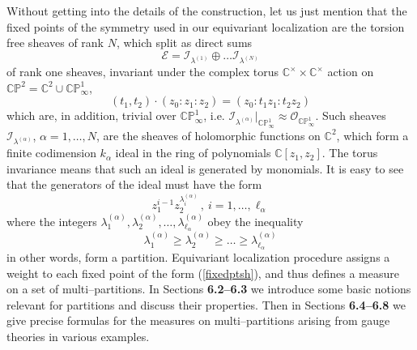 \documentclass[12pt]{article}
\numberwithin{equation}{section}
\newcommand\beq{\begin{equation}}
\newcommand\eeq{\end{equation}}
\theoremstyle{definition}
\newcommand {\BC}   {\mathbb C}
\newcommand {\BP}   {\mathbb P}
\newcommand {\CalE} {\mathcal E}
\newcommand {\CalI} {\mathcal I}
\newcommand {\CalO} {\mathcal O}
\begin{document}
Without getting into the details of the construction, let us just mention that the fixed points of the symmetry used in our equivariant localization are the torsion free sheaves of rank $N$, which split as direct sums
\beq\label{fixedptsh}
{\CalE}= {\CalI}_{{\lambda}^{(1)}} \oplus \ldots {\CalI}_{{\lambda}^{(N)}}
\eeq
of rank one sheaves, invariant under the complex torus ${\BC}^{\times} \times {\BC}^{\times}$
action on ${\BC\BP}^{2} = {\BC}^{2} \cup {\BC\BP}^{1}_{\infty}$, 
\beq
(t_{1}, t_{2}) \cdot (z_{0} : z_{1} : z_{2}) = (z_{0}: t_{1} z_{1} : t_{2}z_{2})
\eeq
which are, in addition, trivial over ${\BC\BP}^{1}_{\infty}$, i.e. ${{\CalI}_{{\lambda}^{(\alpha)}}}\vert_{{\BC\BP}^{1}_{\infty}} \approx {\CalO}_{{\BC\BP}^{1}_{\infty}}$. Such sheaves ${\CalI}_{{\lambda}^{({\alpha})}}$,  ${\alpha}= 1, \ldots, N$,  are the sheaves of holomorphic functions on ${\BC}^{2}$, which form a finite codimension $k_{\alpha}$ ideal in the ring of polynomials ${\BC}[z_{1}, z_{2}]$. The torus invariance means that such an ideal is generated by monomials. It is easy to see
that the generators of the ideal must have the form
\beq
z_{1}^{i-1} z_{2}^{{\lambda}_{i}^{({\alpha})}} \, , \ i = 1, \ldots, {\ell}_{\alpha}
\eeq
where the integers
${\lambda}^{({\alpha})}_{1}, {\lambda}^{({\alpha})}_{2}, \ldots, {\lambda}^{({\alpha})}_{{\ell}_{\alpha}}$ obey the inequality
\beq
{\lambda}^{({\alpha})}_{1} \geq {\lambda}^{({\alpha})}_{2} \geq  \ldots \geq {\lambda}^{({\alpha})}_{{\ell}_{\alpha}}
\eeq
in other words, form a partition. Equivariant localization procedure assigns a weight to each fixed point of the form (\ref{fixedptsh}), and thus defines a measure on a set of multi--partitions. In Sections {\bf 6.2--6.3} we introduce some basic notions relevant for partitions and discuss their properties. Then in Sections {\bf 6.4--6.8} we give precise formulas for the measures on multi--partitions arising from gauge theories in various examples.
\end{document}
